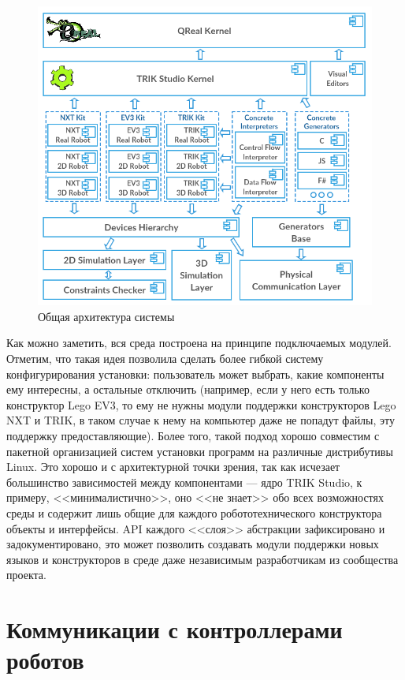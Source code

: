 \documentclass[a5paper]{article}
\begin{document}
\begin{figure}[ht]
    \centering
    \includegraphics[width=4.5in]{TS_Common_Architecture.png}
    \caption{Общая архитектура системы}
    \label{image:commonTSArch}
\end{figure}

Как можно заметить, вся среда построена на принципе подключаемых модулей. Отметим, что такая идея позволила сделать более гибкой систему конфигурирования установки: пользователь может выбрать, какие компоненты ему интересны, а остальные отключить (например, если у него есть только конструктор Lego EV3, то ему не нужны модули поддержки конструкторов Lego NXT и TRIK, в таком случае к нему на компьютер даже не попадут файлы, эту поддержку предоставляющие). Более того, такой подход хорошо совместим с пакетной организацией систем установки программ на различные дистрибутивы Linux. Это хорошо и с архитектурной точки зрения, так как исчезает большинство зависимостей между компонентами --- ядро TRIK Studio, к примеру, <<минималистично>>, оно <<не знает>> обо всех возможностях среды и содержит лишь общие для каждого робототехнического конструктора объекты и интерфейсы. API каждого <<слоя>> абстракции  зафиксировано и задокументировано, это может позволить создавать модули поддержки новых языков и конструкторов в среде даже независимым разработчикам из сообщества проекта.

\section{Коммуникации с контроллерами роботов}
\label{chapter:communications}
\end{document}
